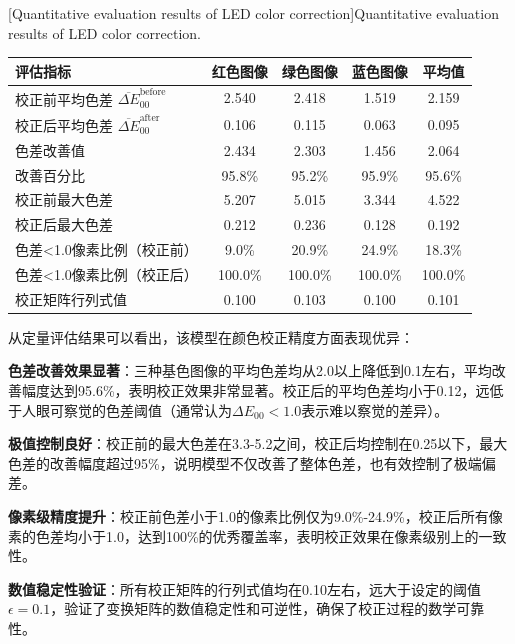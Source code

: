 \begin{table}[h!]
\small    %
\centering
{}[Quantitative evaluation results of LED color correction]{Quantitative evaluation results of LED color correction.}    %
\begin{tabularx}{\textwidth}{lCCCC}
\toprule
评估指标 & 红色图像 & 绿色图像 & 蓝色图像 & 平均值 \\
\midrule
校正前平均色差 $\overline{\Delta E}_{00}^{\text{before}}$ & 2.540 & 2.418 & 1.519 & 2.159 \\
校正后平均色差 $\overline{\Delta E}_{00}^{\text{after}}$ & 0.106 & 0.115 & 0.063 & 0.095 \\
色差改善值 & 2.434 & 2.303 & 1.456 & 2.064 \\
改善百分比 & 95.8\% & 95.2\% & 95.9\% & 95.6\% \\
校正前最大色差 & 5.207 & 5.015 & 3.344 & 4.522 \\
校正后最大色差 & 0.212 & 0.236 & 0.128 & 0.192 \\
色差<1.0像素比例（校正前） & 9.0\% & 20.9\% & 24.9\% & 18.3\% \\
色差<1.0像素比例（校正后） & 100.0\% & 100.0\% & 100.0\% & 100.0\% \\
校正矩阵行列式值 & 0.100 & 0.103 & 0.100 & 0.101 \\
\bottomrule
\end{tabularx}
\label{table:correction_results}
\end{table}

从定量评估结果可以看出，该模型在颜色校正精度方面表现优异：

\textbf{色差改善效果显著}：三种基色图像的平均色差均从2.0以上降低到0.1左右，平均改善幅度达到95.6\%，表明校正效果非常显著。校正后的平均色差均小于0.12，远低于人眼可察觉的色差阈值（通常认为$\Delta E_{00} < 1.0$表示难以察觉的差异）。

\textbf{极值控制良好}：校正前的最大色差在3.3-5.2之间，校正后均控制在0.25以下，最大色差的改善幅度超过95\%，说明模型不仅改善了整体色差，也有效控制了极端偏差。

\textbf{像素级精度提升}：校正前色差小于1.0的像素比例仅为9.0\%-24.9\%，校正后所有像素的色差均小于1.0，达到100\%的优秀覆盖率，表明校正效果在像素级别上的一致性。

\textbf{数值稳定性验证}：所有校正矩阵的行列式值均在0.10左右，远大于设定的阈值$\epsilon=0.1$，验证了变换矩阵的数值稳定性和可逆性，确保了校正过程的数学可靠性。

